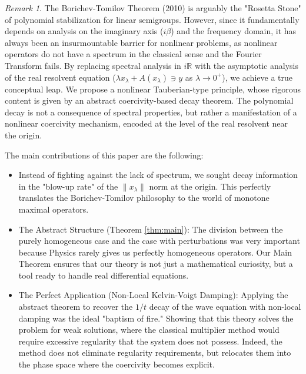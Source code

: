 \documentclass[11pt,reqno]{amsart}
\theoremstyle{remark}
\newtheorem{remark}[theorem]{Remark}
\begin{document}
\begin{remark}

The Borichev-Tomilov Theorem (2010) is arguably the "Rosetta Stone" of polynomial stabilization for linear semigroups. However, since it fundamentally depends on analysis on the imaginary axis ($i\beta$) and the frequency domain, it has always been an insurmountable barrier for nonlinear problems, as nonlinear operators do not have a spectrum in the classical sense and the Fourier Transform fails.
By replacing spectral analysis in $i\mathbb{R}$ with the asymptotic analysis of the real resolvent equation ($\lambda x_\lambda + A(x_\lambda) \ni y$ as $\lambda \to 0^+$), we achieve a true conceptual leap. We propose a nonlinear Tauberian-type principle, whose rigorous content is given by an abstract coercivity-based decay theorem. The polynomial decay is not a consequence of spectral properties,
but rather a manifestation of a nonlinear coercivity mechanism, encoded at the level of the real resolvent near the origin.

\medskip

The main contributions of this paper are the following:

\begin{itemize}
\item Instead of fighting against the lack of spectrum, we sought decay information in the "blow-up rate" of the $\|x_\lambda\|$ norm at the origin. This perfectly translates the Borichev-Tomilov philosophy to the world of monotone maximal operators.

\item The Abstract Structure (Theorem \ref{thm:main}): The division between the purely homogeneous case and the case with perturbations was very important because Physics rarely gives us perfectly homogeneous operators. Our Main Theorem  ensures that our theory is not just a mathematical curiosity, but a tool ready to handle real differential equations.

\item The Perfect Application (Non-Local Kelvin-Voigt Damping): Applying the abstract theorem to recover the $1/t$ decay of the wave equation with non-local damping was the ideal "baptism of fire." Showing that this theory solves the problem for weak solutions, where the classical multiplier method would require excessive regularity that the system does not possess. Indeed, the method does not eliminate regularity requirements, but relocates them into the phase space where the coercivity becomes explicit.

\end{itemize}

\end{remark}
\end{document}
